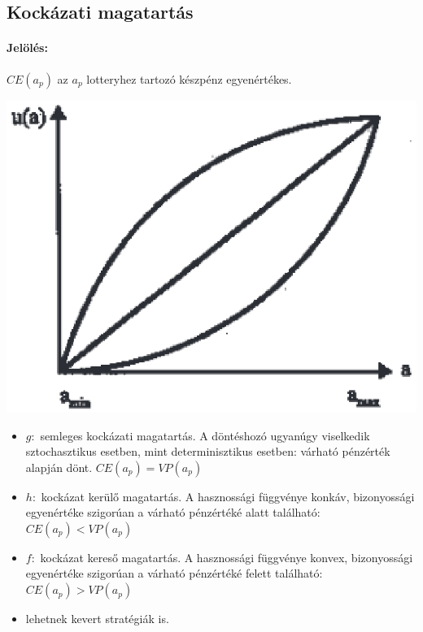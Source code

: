 \documentclass[a4paper,12pt]{article}
\begin{document}





\subsection{Kockázati magatartás}

\paragraph{Jelölés: } $CE(a_p)$ az $a_p$ lotteryhez tartozó készpénz egyenértékes. 

\begin{center}

\includegraphics[scale=0.7]{kockazat}
\\
\end{center}

\begin{itemize}
\item $g:$ semleges kockázati magatartás. A döntéshozó ugyanúgy viselkedik sztochasztikus esetben, mint determinisztikus esetben: várható pénzérték alapján dönt. $CE(a_p) = VP(a_p)$
\item $h:$ kockázat kerülő magatartás. A hasznossági függvénye konkáv, bizonyossági egyenértéke szigorúan a várható pénzértéké alatt található: $CE(a_p) < VP(a_p)$
\item $f:$ kockázat kereső magatartás. A hasznossági függvénye konvex, bizonyossági egyenértéke szigorúan a várható pénzértéké felett található: $CE(a_p) > VP(a_p)$
\item lehetnek kevert stratégiák is.
\end{itemize}
\end{document}
